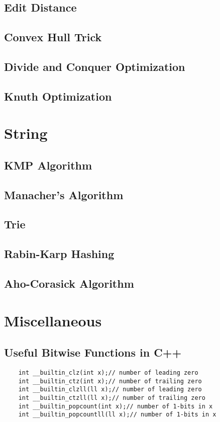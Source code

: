\documentclass[landscape,8pt]{article}
\begin{document}
\begin{multicols}{2}
  \subsection{Edit Distance}

  \subsection{Convex Hull Trick}
  \subsection{Divide and Conquer Optimization}
  \subsection{Knuth Optimization}

\section{String}
  \subsection{KMP Algorithm}

  \subsection{Manacher's Algorithm}

  \subsection{Trie}

  \subsection{Rabin-Karp Hashing}

  \subsection{Aho-Corasick Algorithm}
\columnbreak

\section{Miscellaneous}
  \subsection{Useful Bitwise Functions in C++}
  \begin{verbatim}
    int __builtin_clz(int x);// number of leading zero
    int __builtin_ctz(int x);// number of trailing zero
    int __builtin_clzll(ll x);// number of leading zero
    int __builtin_ctzll(ll x);// number of trailing zero
    int __builtin_popcount(int x);// number of 1-bits in x
    int __builtin_popcountll(ll x);// number of 1-bits in x


\end{verbatim}
\end{multicols}
\end{document}
